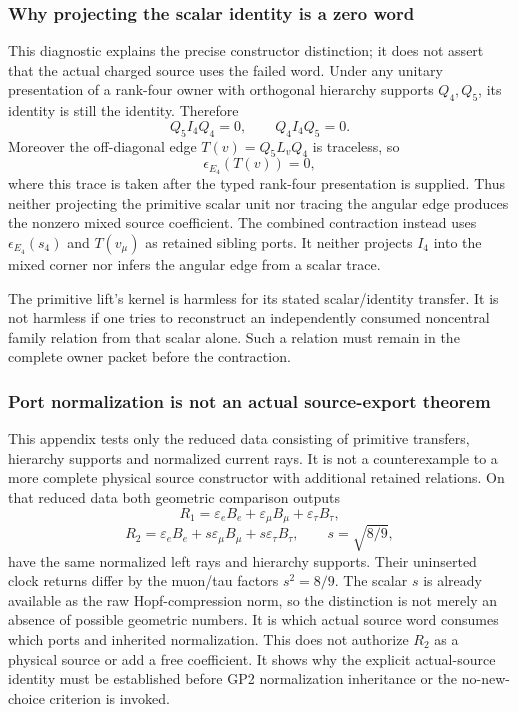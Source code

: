 \documentclass[11pt,a4paper]{article}
\begin{document}
\subsubsection{Why projecting the scalar identity is a zero word}
This diagnostic explains the precise constructor distinction; it does not
assert that the actual charged source uses the failed word.
Under any unitary presentation of a rank-four owner with orthogonal
hierarchy supports $Q_4,Q_5$, its identity is still the identity. Therefore
\[
 \boxed{Q_5I_4Q_4=0,\qquad Q_4I_4Q_5=0.}
\]
Moreover the off-diagonal edge $T(v)=Q_5L_vQ_4$ is traceless, so
\[
 \boxed{\epsilon_{E_4}(T(v))=0,}
\]
where this trace is taken after the typed rank-four presentation is supplied.
Thus neither projecting the primitive scalar unit nor tracing the angular
edge produces the nonzero mixed source coefficient. The combined contraction
instead uses $\epsilon_{E_4}(s_4)$ and $T(v_\mu)$ as retained sibling ports.
It neither projects $I_4$ into the mixed corner nor infers the angular edge
from a scalar trace.

The primitive lift's kernel is harmless for its stated scalar/identity
transfer. It is not harmless if one tries to reconstruct an independently
consumed noncentral family relation from that scalar alone. Such a relation
must remain in the complete owner packet before the contraction.

\subsubsection{Port normalization is not an actual source-export theorem}
This appendix tests only the reduced data consisting of primitive transfers,
hierarchy supports and normalized current rays. It is not a counterexample to
a more complete physical source constructor with additional retained relations.
On that reduced data both geometric comparison outputs
\[
 R_1=\varepsilon_eB_e+\varepsilon_\mu B_\mu+\varepsilon_\tau B_\tau,
\]
\[
 R_2=\varepsilon_eB_e+s\varepsilon_\mu B_\mu+s\varepsilon_\tau B_\tau,
 \qquad s=\sqrt{8/9},
\]
have the same normalized left rays and hierarchy supports. Their uninserted
clock returns differ by the muon/tau factors $s^2=8/9$. The scalar $s$ is
already available as the raw Hopf-compression norm, so the distinction is not
merely an absence of possible geometric numbers. It is which actual source
word consumes which ports and inherited normalization.
This does not authorize $R_2$ as a physical source or add a free coefficient.
It shows why the explicit actual-source identity must be established before
GP2 normalization inheritance or the no-new-choice criterion is invoked.
\end{document}
